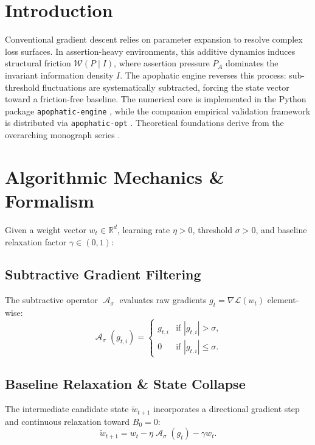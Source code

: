 \documentclass[11pt,a4paper]{article}
\DeclareMathOperator{\Apophatic}{\mathcal{A}}
\newcommand{\Wfriction}{\mathcal{W}}
\newcommand{\Ppress}{P_A}
\newcommand{\Baseline}{B_0}
\begin{document}
\clearpage

\section{Introduction}
Conventional gradient descent relies on parameter expansion to resolve complex loss surfaces. In assertion-heavy environments, this additive dynamics induces structural friction $\Wfriction(P \mid I)$, where assertion pressure $\Ppress$ dominates the invariant information density $I$. The apophatic engine reverses this process: sub-threshold fluctuations are systematically subtracted, forcing the state vector toward a friction-free baseline. The numerical core is implemented in the Python package \texttt{apophatic-engine} \cite{apophatic_engine_pypi}, while the companion empirical validation framework is distributed via \texttt{apophatic-opt} \cite{apophatic_opt_pypi}. Theoretical foundations derive from the overarching monograph series \cite{nicht_theory_monograph}.

\section{Algorithmic Mechanics \& Formalism}

Given a weight vector $w_t \in \mathbb{R}^d$, learning rate $\eta > 0$, threshold $\sigma > 0$, and baseline relaxation factor $\gamma \in (0, 1)$:

\subsection{Subtractive Gradient Filtering}
The subtractive operator $\Apophatic_\sigma$ evaluates raw gradients $g_t = \nabla \mathcal{L}(w_t)$ element-wise:
\begin{equation}
\Apophatic_\sigma(g_{t, i}) = 
\begin{cases} 
g_{t, i} & \text{if } |g_{t, i}| > \sigma, \\
0        & \text{if } |g_{t, i}| \le \sigma.
\end{cases}
\end{equation}

\subsection{Baseline Relaxation \& State Collapse}
The intermediate candidate state $\tilde{w}_{t+1}$ incorporates a directional gradient step and continuous relaxation toward $\Baseline = 0$:
\begin{equation}
\tilde{w}_{t+1} = w_t - \eta \Apophatic_\sigma(g_t) - \gamma w_t.
\end{equation}
\end{document}
